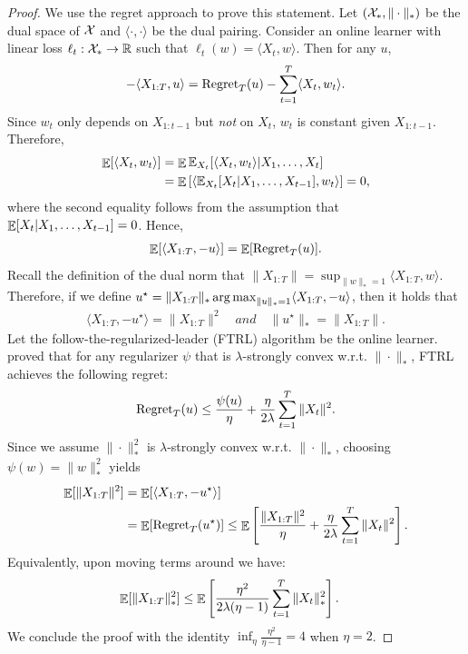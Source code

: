 \begin{proof}
We use the regret approach to prove this statement. Let $({\cal X}_\ast,\|\cdot\|_\ast)$ be the dual space of ${\cal X}$ and $\langle\cdot,\cdot\rangle$ be the dual pairing. Consider an online learner with linear loss $\ell_t:{\cal X}_\ast\to \mathbb R$ such that $\ell_t(w)=\langle X_t, w\rangle$. Then for any $u$,
\begin{align*}
    - \langle X_{1:T}, u\rangle = \mathrm{Regret}_T(u) - \sum_{t=1}^T \langle X_t, w_t\rangle.
\end{align*}
Since $w_t$ only depends on $X_{1:t-1}$ but \textit{not} on $X_t$, $w_t$ is constant given $X_{1:t-1}$. Therefore,
\begin{align*}
    \mathop{\mathbb{E}}[\langle X_t, w_t\rangle]
    &= \mathop{\mathbb{E}}\mathbb{E}_{X_t}[\langle X_t, w_t\rangle | X_1,\ldots,X_t] \\
    &= \mathop{\mathbb{E}}\left[\langle \mathbb{E}_{X_t}[X_t|X_1,\ldots,X_{t-1}], w_t\rangle \right] = 0,
\end{align*}
where the second equality follows from the assumption that $\mathop{\mathbb{E}}[X_t|X_1,\ldots,X_{t-1}]=0$. Hence,
\begin{align*}
    \mathop{\mathbb{E}}[\langle X_{1:T}, -u\rangle] = \mathop{\mathbb{E}}[\mathrm{Regret}_T(u)].
\end{align*}
Recall the definition of the dual norm that $\|X_{1:T}\| = \sup_{\|w\|_\ast=1} \langle X_{1:T},w\rangle$. Therefore, if we define $u^\star=\|X_{1:T}\|_*\mathop{\operatorname{arg\,max}}_{\|u\|_\ast=1}\langle X_{1:T},-u\rangle$, then it holds that
\begin{align*}
    \langle X_{1:T},-u^\star\rangle = \|X_{1:T}\|^2 \quad\textit{and}\quad \|u^\star\|_\ast=\|X_{1:T}\|.
\end{align*}
Let the follow-the-regularized-leader (FTRL) algorithm be the online learner. \cite{orabona2019modern} proved that for any regularizer $\psi$ that is $\lambda$-strongly convex w.r.t. $\|\cdot\|_\ast$, FTRL achieves the following regret:
\begin{align*}
    \mathrm{Regret}_T(u) \leq \frac{\psi(u)}{\eta} +\frac{\eta}{2\lambda} \sum_{t=1}^T\|X_t\|^2.
\end{align*}
Since we assume $\|\cdot\|_\ast^2$ is $\lambda$-strongly convex w.r.t. $\|\cdot\|_\ast$, choosing $\psi(w)=\|w\|_\ast^2$ yields
\begin{align*}
    \mathop{\mathbb{E}}[\|X_{1:T}\|^2] 
    &= \mathop{\mathbb{E}}[\langle X_{1:T}, -u^\star\rangle] \\
    &= \mathop{\mathbb{E}}[\mathrm{Regret}_T(u^\star)]
    \le \mathop{\mathbb{E}}\left[ \frac{\|X_{1:T}\|^2}{\eta} + \frac{\eta}{2\lambda} \sum_{t=1}^T \|X_t\|^2 \right].
\end{align*}
Equivalently, upon moving terms around we have:
\begin{align*}
    \mathop{\mathbb{E}}[\|X_{1:T}\|_\ast^2]
    &\le \mathop{\mathbb{E}}\left[ \frac{\eta^2}{2\lambda (\eta-1)} \sum_{t=1}^T\|X_t\|_*^2 \right].
\end{align*}
We conclude the proof with the identity $\inf_\eta \frac{\eta^2}{\eta-1}=4$ when $\eta=2$.
\end{proof}


